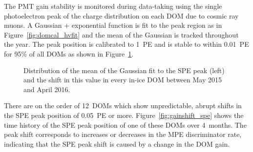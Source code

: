 The PMT gain stability is monitored during data-taking using the
single photoelectron peak of the charge distribution on each DOM due
to cosmic ray muons. A
Gaussian + exponential function is fit to the peak region as in Figure~\ref{fig:domcal_hvfit} and the mean of the Gaussian is
tracked throughout the year. The peak position is calibrated to 1~PE
and is stable to within 0.01~PE for 95\% of all DOMs as shown in
Figure~\ref{fig:gain_spe_stability}.

\begin{figure}[!h]
  \captionsetup[subfigure]{labelformat=empty}
  \centering
  \caption{Distribution of the mean of the Gaussian fit to the SPE
    peak (left) and the shift in this value in every in-ice DOM between  May 2015 and April
   2016.}
  \label{fig:gain_spe_stability}
\end{figure} 

There are on the
order of 12~DOMs which show unpredictable, abrupt shifts in the SPE peak
position of 0.05~PE or more. Figure~\ref{fig:gainshift_spe} shows the time history of the
SPE peak position of one of these DOMs over 4~months. The peak shift
corresponds to increases or decreases in the MPE discriminator rate,
indicating that the SPE peak shift is caused by a change in the DOM
gain. 

